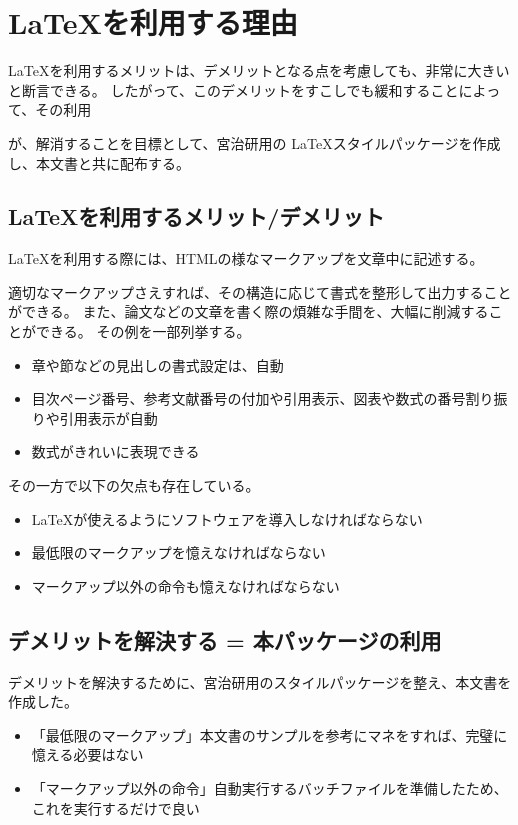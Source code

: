 \section{\LaTeX を利用する理由}
\LaTeX を利用するメリットは、デメリットとなる点を考慮しても、非常に大きいと断言できる。
したがって、このデメリットをすこしでも緩和することによって、その利用

が、解消することを目標として、宮治研用の \LaTeX スタイルパッケージを作成し、本文書と共に配布する。


\subsection{\LaTeX を利用するメリット/デメリット}

\LaTeX を利用する際には、HTMLの様なマークアップを文章中に記述する。

適切なマークアップさえすれば、その構造に応じて書式を整形して出力することができる。
また、論文などの文章を書く際の煩雑な手間を、大幅に削減することができる。
その例を一部列挙する。
\begin{itemize}
\item 章や節などの見出しの書式設定は、自動
\item 目次ページ番号、参考文献番号の付加や引用表示、図表や数式の番号割り振りや引用表示が自動
\item 数式がきれいに表現できる
\end{itemize}

その一方で以下の欠点も存在している\cite{test}。
\begin{itemize}
\item \LaTeX が使えるようにソフトウェアを導入しなければならない
\item 最低限のマークアップを憶えなければならない
\item マークアップ以外の命令も憶えなければならない
\end{itemize}


\subsection{デメリットを解決する = 本パッケージの利用}
デメリットを解決するために、宮治研用のスタイルパッケージを整え、本文書を作成した。

\begin{itemize}
\item 「最低限のマークアップ」本文書のサンプルを参考にマネをすれば、完璧に憶える必要はない
\item 「マークアップ以外の命令」自動実行するバッチファイルを準備したため、これを実行するだけで良い
\end{itemize}

